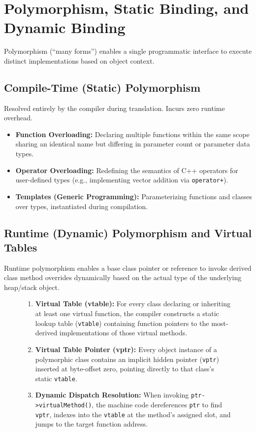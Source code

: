 \section{Polymorphism, Static Binding, and Dynamic Binding}
\label{sec:polymorphism_binding}

Polymorphism (``many forms'') enables a single programmatic interface to execute distinct implementations based on object context.

\subsection{Compile-Time (Static) Polymorphism}
Resolved entirely by the compiler during translation. Incurs zero runtime overhead.
\begin{itemize}[leftmargin=*]
    \item \textbf{Function Overloading:} Declaring multiple functions within the same scope sharing an identical name but differing in parameter count or parameter data types.
    \item \textbf{Operator Overloading:} Redefining the semantics of C++ operators for user-defined types (e.g., implementing vector addition via \texttt{operator+}).
    \item \textbf{Templates (Generic Programming):} Parameterizing functions and classes over types, instantiated during compilation.
\end{itemize}

\subsection{Runtime (Dynamic) Polymorphism and Virtual Tables}
Runtime polymorphism enables a base class pointer or reference to invoke derived class method overrides dynamically based on the actual type of the underlying heap/stack object.

\begin{figure}[htbp]
\centering
\begin{tcolorbox}[colback=white,colframe=primary,title=\textbf{Vtable and Vptr Internal Dispatch Mechanics in C++}]
\begin{enumerate}[leftmargin=*]
    \item \textbf{Virtual Table (vtable):} For every class declaring or inheriting at least one virtual function, the compiler constructs a static lookup table (\texttt{vtable}) containing function pointers to the most-derived implementations of those virtual methods.
    \item \textbf{Virtual Table Pointer (vptr):} Every object instance of a polymorphic class contains an implicit hidden pointer (\texttt{vptr}) inserted at byte-offset zero, pointing directly to that class's static \texttt{vtable}.
    \item \textbf{Dynamic Dispatch Resolution:} When invoking \texttt{ptr->virtualMethod()}, the machine code dereferences \texttt{ptr} to find \texttt{vptr}, indexes into the \texttt{vtable} at the method's assigned slot, and jumps to the target function address.
\end{enumerate}
\end{tcolorbox}
\end{figure}


